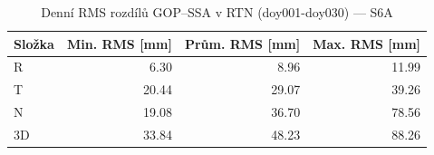 \begin{table}[H]
\centering
\caption{Denní RMS rozdílů GOP–SSA v RTN (doy001-doy030) — S6A}
\label{tab:s6_ZAZG_doy001-doy030_rms}
\begin{tabular}{lrrr}
\toprule
Složka & Min. RMS [mm] & Prům. RMS [mm] & Max. RMS [mm] \\
\midrule
R & 6.30 & 8.96 & 11.99 \\
T & 20.44 & 29.07 & 39.26 \\
N & 19.08 & 36.70 & 78.56 \\
3D & 33.84 & 48.23 & 88.26 \\
\bottomrule
\end{tabular}
\end{table}
